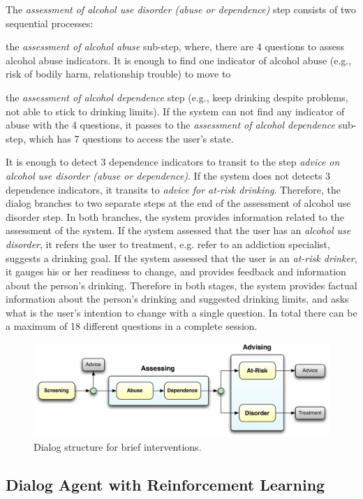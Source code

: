 \documentclass[letterpaper]{article}
\begin{document}
The {\em assessment of alcohol use disorder (abuse or dependence)} step consists of two sequential processes: \begin{inparaenum}[1)] \item the 
{\em assessment of alcohol abuse} sub-step, where, there are 4 questions to assess alcohol abuse indicators.  It is 
enough to find one indicator of alcohol abuse (e.g., risk of bodily harm, relationship trouble) to 
move to \item the {\em assessment of alcohol dependence} step   (e.g., keep drinking despite problems, not able 
to stick to drinking limits). If the system can not find any indicator of abuse with the 4 
questions, it passes to the {\em assessment of alcohol dependence} sub-step, which has  7 questions to access the user's state. 
\end{inparaenum}

It is enough to detect 3 dependence indicators to transit to the step {\em advice on alcohol use disorder (abuse or dependence)}.  If the system does not detects 3 dependence 
indicators, it transits to {\em advice for at-risk drinking}. Therefore, the dialog branches to two 
separate steps at the end of the assessment of alcohol use disorder step. In both branches, the system provides information 
related to the assessment of the system.  If the system assessed that the user has an {\em alcohol use 
disorder}, it refers the user to treatment, e.g. refer to an addiction specialist, suggests a drinking goal.  If 
the system assessed that the user is an {\em at-risk drinker}, it gauges his or her readiness to change, and provides feedback and 
information about the person's drinking. Therefore in both stages, the system provides factual 
information about the person's drinking and suggested drinking limits, and asks what is the user's 
intention to change with a single question.  In total there can be a maximum of 18 different 
questions in a complete session.   

\begin{figure}[!t] 
\centering 
\includegraphics[width=.45\textwidth]{figures/dialog_manager_v2} 
\caption{Dialog structure for brief interventions.} 
\label{fig:dialog_manager} 
\end{figure}

\subsection*{Dialog Agent with Reinforcement Learning}
\end{document}
